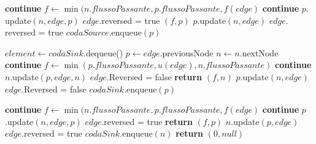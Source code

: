 \documentclass{article}
\begin{document}
\begin{algorithm}
\begin{algorithmic}[1]
\STATE \textbf{continue}
\ELSE
\STATE $f \leftarrow \min(n.flussoPassante,p.flussoPassante,f(edge)$
\STATE \textbf{continue}
\ENDIF
\STATE $p.$update$(n,edge,p)$
\STATE $edge.$reversed = true
\RETURN $(f,p)$
\ENDIF
\ENDIF
\STATE $p.$update$(n,edge)$
\STATE $edge.$reversed = true
\STATE $codaSource.$enqueue$(p)$
\ENDIF

\ENDFOR
\ENDIF

\STATE $element \leftarrow codaSink.$dequeue()
\STATE $p \leftarrow edge$.previousNode 
\STATE $n \leftarrow n.$nextNode
\STATE \textbf{continue}
\ELSE
\STATE $f \leftarrow \min(p.flussoPassante,u(edge),n.flussoPassante)$ 
\STATE \textbf{continue}
\ENDIF
\STATE $n.$update$(p,edge,n)$
\STATE $edge.$Reversed = false
\STATE \textbf{return} $(f,n)$
\ENDIF
\ENDIF
\STATE $p.$update$(n,edge)$
\STATE $edge.$Reversed = false
\STATE $codaSink.$enqueue$(p)$
\ENDIF
{}
\end{algorithmic}
\end{algorithm}
\newpage
\begin{algorithm}
\begin{algorithmic}[1]
\STATE \textbf{continue}
\ELSE
\STATE $f \leftarrow \min(n.flussoPassante,p.flussoPassante,f(edge)$ 
\STATE \textbf{continue}
\ENDIF
\STATE $p$.update$(n,edge,p)$
\STATE $edge$.reversed = true
\STATE \textbf{return} $(f,p)$
\ENDIF
\ENDIF
\STATE $n.$update$(p,edge)$
\STATE $edge$.reversed = true
\STATE $codaSink.$enqueue$(n)$
\ENDIF
\ENDFOR
\ENDIF
\ENDWHILE
\STATE \textbf{return} $(0,null)$
\end{algorithmic}
\end{algorithm}
\end{document}
